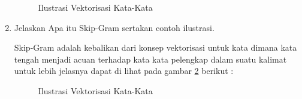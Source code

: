 \begin{enumerate}
\begin{figure}[!htbp]
    \caption{Ilustrasi Vektorisasi Kata-Kata}
    \label{5}
    \end{figure}

\item Jelaskan Apa itu Skip-Gram sertakan contoh ilustrasi. \par
Skip-Gram adalah kebalikan dari konsep vektorisasi untuk kata dimana kata tengah menjadi acuan terhadap kata kata pelengkap dalam suatu kalimat untuk lebih jelasnya dapat di lihat pada gambar \ref{6} berikut :

\begin{figure}[!htbp]
    \caption{Ilustrasi Vektorisasi Kata-Kata}
    \label{6}
    \end{figure}

\end{enumerate}